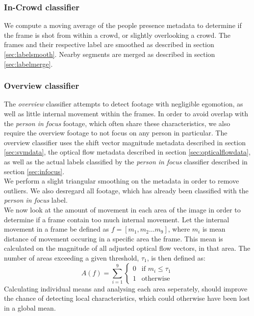 \subsubsection{In-Crowd classifier}\label{sec:incrowd}
%
We compute a moving average of the people presence metadata to determine if the frame is shot from within a crowd, or slightly overlooking a crowd. The frames and their respective label are smoothed as described in section \ref{sec:labelsmooth}. Nearby segments are merged as described in section \ref{sec:labelmerge}.
%
\subsubsection{Overview classifier}\label{sec:overviewclassifier}
%
The \textit{overview} classifier attempts to detect footage with negligible egomotion, as well as little internal movement within the frames. In order to avoid overlap with the \textit{person in focus} footage, which often share these characteristics, we also require the overview footage to not focus on any person in particular. The overview classifier uses the shift vector magnitude metadata described in section \ref{sec:svmdata}, the optical flow metadata described in section \ref{sec:opticalflowdata}, as well as the actual labels classified by the \textit{person in focus} classifier described in section \ref{sec:infocus}.\\
We perform a slight triangular smoothing on the metadata in order to remove outliers. We also desregard all footage, which has already been classified with the \textit{person in focus} label.\\
We now look at the amount of movement in each area of the image in order to determine if a frame contain too much internal movement. Let the internal movement in a frame be defined as $f = [m_{1},m_{2} \dots m_{9}]$, where $m_{i}$ is mean distance of movement occuring in a specific area the frame. This mean is calculated on the magnitude of all adjusted optical flow vectors, in that area. The number of areas exceeding a given threshold, $\tau_{1}$, is then defined as:
%
\begin{equation}
A(f) = \sum_{i=1}^{9}
\begin{cases}
0 & \text{if } m_{i} \leq \tau_{1}\\
1 &  \text{otherwise}
\end{cases}
\end{equation}
%
Calculating individual means and analysing each area seperately, should improve the chance of detecting local characteristics, which could otherwise have been lost in a global mean.\\

